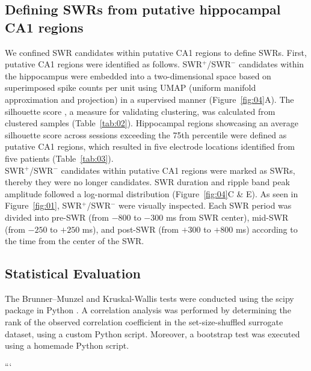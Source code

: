 \subsection{Defining SWRs from putative hippocampal CA1 regions}
We confined SWR candidates within putative CA1 regions to define SWRs. First, putative CA1 regions were identified as follows. SWR$^+$/SWR$^-$ candidates within the hippocampus were embedded into a two-dimensional space based on superimposed spike counts per unit using UMAP (uniform manifold approximation and projection) \cite{mcinnes_umap_2018} in a supervised manner (Figure~\ref{fig:04}A). The silhouette score \cite{rousseeuw_silhouettes_1987}, a measure for validating clustering, was calculated from clustered samples (Table~\ref{tab:02}). Hippocampal regions showcasing an average silhouette score across sessions exceeding the 75th percentile were defined as putative CA1 regions, which resulted in five electrode locations identified from five patients (Table~\ref{tab:03}).
\\
\indent
SWR$^+$/SWR$^-$ candidates within putative CA1 regions were marked as SWRs, thereby they were no longer candidates. SWR duration and ripple band peak amplitude followed a log-normal distribution (Figure~\ref{fig:04}C \& E). As seen in Figure~\ref{fig:01}, SWR$^+$/SWR$^-$ were visually inspected. Each SWR period was divided into pre-SWR (from $-800$ to $-300$ ms from SWR center), mid-SWR (from $-250$ to $+250$ ms), and post-SWR (from $+300$ to $+800$ ms) according to the time from the center of the SWR.

\subsection{Statistical Evaluation}
The Brunner--Munzel and Kruskal-Wallis tests were conducted using the scipy package in Python \cite{virtanen_scipy_2020}. A correlation analysis was performed by determining the rank of the observed correlation coefficient in the set-size-shuffled surrogate dataset, using a custom Python script. Moreover, a bootstrap test was executed using a homemade Python script.

\label{sec:methods}
```